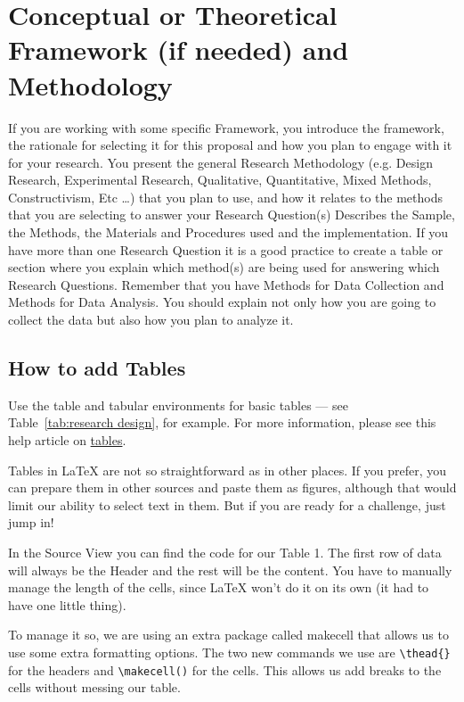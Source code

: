 \documentclass{article}
\begin{document}
\section{Conceptual or Theoretical Framework (if needed) and Methodology}
If you are working with some specific Framework, you introduce the framework, the rationale for selecting it for this proposal and how you plan to engage with it for your research.
You present the general Research Methodology (e.g. Design Research, Experimental Research, Qualitative, Quantitative, Mixed Methods, Constructivism, Etc …) that you plan to use, and how it relates to the methods that you are selecting to answer your Research Question(s)
Describes the Sample, the Methods, the Materials and Procedures used and the implementation. If you have more than one Research Question it is a good practice to create a table or section where you explain which method(s) are being used for answering which Research Questions.
Remember that you have Methods for Data Collection and Methods for Data Analysis. You should explain not only how you are going to collect the data but also how you plan to analyze it.

\subsection{How to add Tables}

Use the table and tabular environments for basic tables --- see Table~\ref{tab:research design}, for example. For more information, please see this help article on \href{https://www.overleaf.com/learn/latex/tables}{tables}. 

Tables in \LaTeX \hspace{1pt} are not so straightforward as in other places. If you prefer, you can prepare them in other sources and paste them as figures, although that would limit our ability to select text in them. But if you are ready for a challenge, just jump in!

In the Source View you can find the code for our Table 1. The first row of data will always be the Header and the rest will be the content. You have to manually manage the length of the cells, since \LaTeX \hspace{1pt} won't do it on its own (it had to have one little thing). 

To manage it so, we are using an extra package called makecell that allows us to use some extra formatting options. The two new commands we use are \verb+\thead{}+ for the headers and \verb+\makecell()+ for the cells. This allows us add breaks to the cells without messing our table. 
\end{document}
